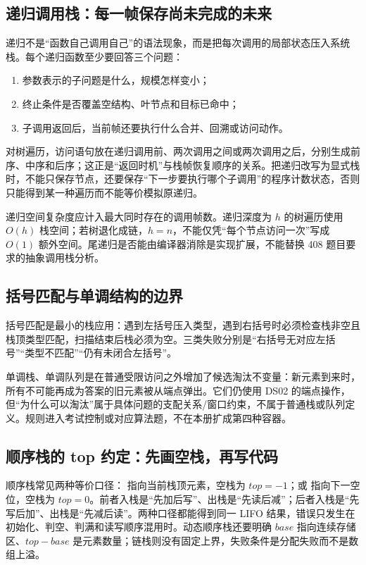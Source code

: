 \documentclass[UTF8,fontset=none,11pt,a4paper]{ctexart}
\begin{document}
\subsection{递归调用栈：每一帧保存尚未完成的未来}
递归不是“函数自己调用自己”的语法现象，而是把每次调用的局部状态压入系统栈。每个递归函数至少要回答三个问题：
\begin{enumerate}
\item 参数表示的子问题是什么，规模怎样变小；
\item 终止条件是否覆盖空结构、叶节点和目标已命中；
\item 子调用返回后，当前帧还要执行什么合并、回溯或访问动作。
\end{enumerate}
对树遍历，访问语句放在递归调用前、两次调用之间或两次调用之后，分别生成前序、中序和后序；这正是“返回时机”与栈帧恢复顺序的关系。把递归改写为显式栈时，不能只保存节点，还要保存“下一步要执行哪个子调用”的程序计数状态，否则只能得到某一种遍历而不能等价模拟原递归。

递归空间复杂度应计入最大同时存在的调用帧数。递归深度为 $h$ 的树遍历使用 $O(h)$ 栈空间；若树退化成链，$h=n$，不能仅凭“每个节点访问一次”写成 $O(1)$ 额外空间。尾递归是否能由编译器消除是实现扩展，不能替换 408 题目要求的抽象调用栈分析。

\subsection{括号匹配与单调结构的边界}
括号匹配是最小的栈应用：遇到左括号压入类型，遇到右括号时必须检查栈非空且栈顶类型匹配，扫描结束后栈必须为空。三类失败分别是“右括号无对应左括号”“类型不匹配”“仍有未闭合左括号”。

单调栈、单调队列是在普通受限访问之外增加了候选淘汰不变量：新元素到来时，所有不可能再成为答案的旧元素被从端点弹出。它们仍使用 DS02 的端点操作，但“为什么可以淘汰”属于具体问题的支配关系/窗口约束，不属于普通栈或队列定义。规则进入考试控制或对应算法题，不在本册扩成第四种容器。

\subsection{顺序栈的 top 约定：先画空栈，再写代码}
顺序栈常见两种等价口径： 指向当前栈顶元素，空栈为 $top=-1$；或  指向下一空位，空栈为 $top=0$。前者入栈是“先加后写”、出栈是“先读后减”；后者入栈是“先写后加”、出栈是“先减后读”。两种口径都能得到同一 LIFO 结果，错误只发生在初始化、判空、判满和读写顺序混用时。动态顺序栈还要明确 $base$ 指向连续存储区、$top-base$ 是元素数量；链栈则没有固定上界，失败条件是分配失败而不是数组上溢。
\end{document}
